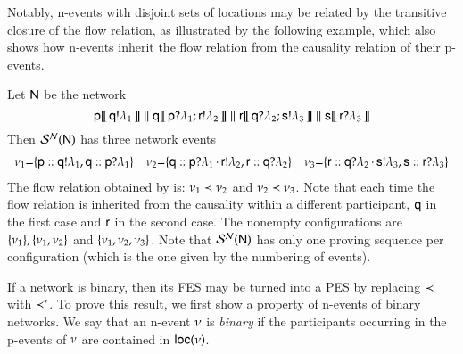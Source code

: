 Notably, n-events with disjoint sets of 
 locations  may 
be
related by the transitive closure of the flow relation, as illustrated
by the following example, which also shows how  n-events 
inherit the flow relation from the causality relation of their 
p-events. 


\begin{example}

  Let ${\sf N}$ be the network 
\[
 \pP{\pp}{\sendL{\q}{\la_1}}\parN
    \pP{\q}{\Seq{\rcvL{\pp}{\la_1}}{\sendL{\pr}{\la_2}}} \parN
    \pP{\pr}{\Seq{\rcvL{\q}{\la_2}}{\sendL{\ps}{\la_3}}}\parN
    \pP{\ps}{\rcvL{\pr}{\la_3}}
\]
Then $\mathcal{S}^{\mathcal{N}}({\sf N})$ has three network  events
\[
\begin{array}{c}
\nu_1 {=}
    \{{\sf p}:: {\sf q}!\lambda_1,{\sf q}:: {\sf p}?\lambda_1\}\quad
    \nu_2 {=}
    \{{\sf q}:: {{\sf p}?\lambda_1}\,{\cdot}\,{\sf r}!\lambda_2,{\sf r}:: {\sf q}?\lambda_2\}
\quad
  \nu_3 {=} 
    \{{\sf r}:: {\sf q}?\lambda_2\,{\cdot}\,{\sf s}!\lambda_3,
      {\sf s}:: {\sf r}?\lambda_3\}
\end{array}
  \]    
The flow relation obtained by
   is: $\nu_1 \prec \nu_2$ and
  $\nu_2 \prec \nu_3$.  Note that each time the flow relation
  is inherited from the causality within a different participant, ${\sf q}$
  in the first case and ${\sf r}$ in the second case.  
  The nonempty configurations are $\{\nu_1\}, \{\nu_1,
    \nu_2\}$ and $\{\nu_1, \nu_2, \nu_3\}$.
%
Note that $\mathcal{S}^{\mathcal{N}}({\sf N})$ has only one proving sequence per configuration
(which is  the one  given by the numbering of events).
\end{example}



If  a network is  binary, %
then its FES may be turned into a PES by replacing $\prec$ with
$\prec^*$.  To prove this result, we first show  a
property of n-events of binary networks. We say that an n-event
$\nu$ is {\em binary} if  the participants occurring in 
the p-events of $\nu$ are contained in ${\sf loc}(\nu)$. 


